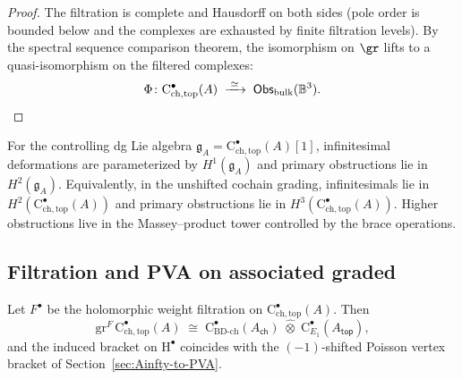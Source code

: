 \begin{proof}
The filtration is complete and Hausdorff on both sides (pole order is bounded below and the complexes are exhausted by finite filtration levels). By the spectral sequence comparison theorem, the isomorphism on $\gr$ lifts to a quasi-isomorphism on the filtered complexes:
\[
\Phi \colon \mathrm{C}^\bullet_{\mathrm{ch,top}}(A) \;\xrightarrow{\;\simeq\;}\; \mathsf{Obs}_{\mathrm{bulk}}(\mathbb{B}^3). \qedhere
\]
\end{proof}

\begin{corollary}
\label{cor:obstructions-brace}
For the controlling dg Lie algebra
$\mathfrak g_A=\mathrm{C}^\bullet_{\mathrm{ch,top}}(A)[1]$,
infinitesimal deformations are parameterized by
$H^1(\mathfrak g_A)$ and primary obstructions lie in
$H^2(\mathfrak g_A)$. Equivalently, in the unshifted cochain grading,
infinitesimals lie in
$H^2(\mathrm{C}^\bullet_{\mathrm{ch,top}}(A))$ and primary
obstructions lie in
$H^3(\mathrm{C}^\bullet_{\mathrm{ch,top}}(A))$. Higher obstructions
live in the Massey--product tower controlled by the brace operations.
\end{corollary}

\subsection{Filtration and PVA on associated graded}
\label{subsec:filtration-PVA-brace}
Let $F^\bullet$ be the holomorphic weight filtration on $\mathrm{C}^\bullet_{\mathrm{ch,top}}(A)$. Then
\[
\mathrm{gr}^F\, \mathrm{C}^\bullet_{\mathrm{ch,top}}(A)
\;\cong\;
\mathrm{C}^\bullet_{\mathrm{BD\text{-}ch}}(A_{\mathsf{ch}})\;\widehat\otimes\; \mathrm{C}^\bullet_{E_1}(A_{\mathsf{top}}),
\]
and the induced bracket on $\mathrm{H}^\bullet$ coincides with the $(-1)$‑shifted Poisson vertex bracket of Section~\ref{sec:Ainfty-to-PVA}.
